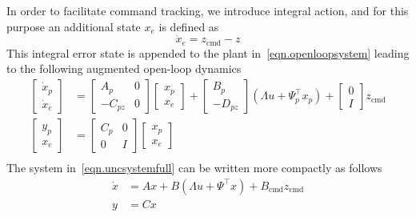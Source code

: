 \documentclass[]{../sty/aiaa-tc}
\begin{document}
  In order to facilitate command tracking, we introduce integral action, and for this purpose an additional state $x_e$ is defined as
  \begin{equation}
    \label{eqn.xedot}
    \dot{x}_{e}=z_{\text{cmd}}-z
  \end{equation}
  This integral error state is appended to the plant in\ \eqref{eqn.openloopsystem} leading to the following augmented open-loop dynamics
  \begin{equation}
    \label{eqn.uncsystemfull}
    \begin{split}
      \begin{bmatrix}
        \dot{x}_{p} \\
        \dot{x}_{e}
      \end{bmatrix}
      &=
      \begin{bmatrix}
        A_{p} & 0 \\
        -C_{pz} & 0
      \end{bmatrix}
      \begin{bmatrix}
        x_{p} \\
        x_{e}
      \end{bmatrix}
      +
      \begin{bmatrix}
        B_{p} \\
        -D_{pz}
      \end{bmatrix}(\Lambda u+\Psi_{p}^{\top}x_{p})
      +
      \begin{bmatrix}
        0 \\
        I
      \end{bmatrix}z_{\text{cmd}} \\
      \begin{bmatrix}
        y_{p} \\
        x_{e}
      \end{bmatrix}
      &=
      \begin{bmatrix}
        C_{p} & 0 \\
        0 & I
      \end{bmatrix}
      \begin{bmatrix}
        x_{p} \\
        x_{e}
      \end{bmatrix} \\
    \end{split}
  \end{equation}
  The system in\ \eqref{eqn.uncsystemfull} can be written more compactly as follows
  \begin{equation}
    \label{eqn.uncsystem}
    \begin{split}
      \dot{x}&=Ax+B(\Lambda u+\Psi^{\top}x)+B_{\text{cmd}}z_{\text{cmd}} \\
      y&=Cx
    \end{split}
  \end{equation}
\end{document}

